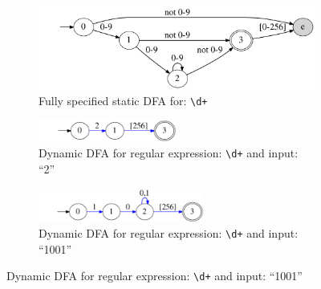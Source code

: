 \begin{figure}[t]
  \begin{subfigure}[t]{0.45\textwidth}
  	\centering
    \includegraphics[width=\textwidth]{figures/digitsDFA}
    \vspace{-12pt}
    \caption{Fully specified static DFA for: {\tt \textbackslash d+}}
    \label{fig:staticfull}
  \end{subfigure}


\vspace{6pt}
  \begin{subfigure}[t]{0.45\textwidth}
  	\centering
    \includegraphics[width=0.5\textwidth]{figures/digits2}
    \vspace{-6pt}
    \caption{Dynamic DFA for regular expression: {\tt \textbackslash d+} and input: ``2''}
    \label{fig:match1}
  \end{subfigure}

\vspace{6pt}

  \begin{subfigure}[t]{0.45\textwidth}
  	\centering
    \includegraphics[width=0.6\textwidth]{figures/digits1001}
    \vspace{-6pt}
    \caption{Dynamic DFA for regular expression: {\tt \textbackslash d+} and input: ``1001''}
    \label{fig:match2}
  \end{subfigure}
  

\end{figure}
